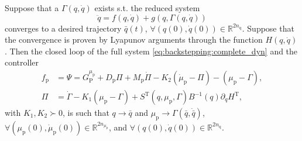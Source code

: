 \begin{theorem}
	Suppose that a $\Gamma(q,\dot{q})$ exists s.t. the reduced system
	\begin{equation}\label{eq:backstepping:reduced_sys}
		\ddot{q} = f(q,\dot{q}) + g(q,\Gamma(q,\dot{q}))
	\end{equation}
	converges to a desired trajectory $\bar{q}(t)$, $\forall (q(0),\dot{q}(0)) \in \mathbb{R}^{2 n_{\mathrm{q}}}$. Suppose that the convergence is proven by Lyapunov arguments through the function $H(q,\dot{q})$. Then the closed loop of the full system \eqref{eq:backstepping:complete_dyn} and the controller
	\begin{equation}\label{eq:backstepping:pi_psi}
		\begin{split}
			f_\mathrm{p} &= \Psi = G_{\mathrm{P}}^{\mu_\mathrm{p}} + D_\mathrm{p} \Pi + M_\mathrm{p} \dot{\Pi} - K_2 (\dot{\mu}_\mathrm{p} - \Pi) - (\mu_\mathrm{p} - \Gamma),\\
			\Pi &= \dot{\Gamma} - K_1 (\mu_\mathrm{p} - \Gamma) 
			+ S^{\mathrm{T}}(q,\mu_\mathrm{p},\Gamma)B^{-1}(q)\partial_{\dot{q}} H^{\mathrm{T}},
		\end{split}
	\end{equation}
	with $K_1,K_2 \succ 0$, is such that $q \rightarrow \bar{q}$ and $\mu_\mathrm{p} \rightarrow \Gamma(\bar q,\dot{\bar q})$, $\forall (\mu_\mathrm{p}(0),\dot{\mu}_\mathrm{p}(0)) \in \mathbb{R}^{2n_{\mu_\mathrm{p}}}$, and $\forall (q(0),\dot{q}(0)) \in \mathbb{R}^{2 n_{\mathrm{q}}}$.
\end{theorem}

